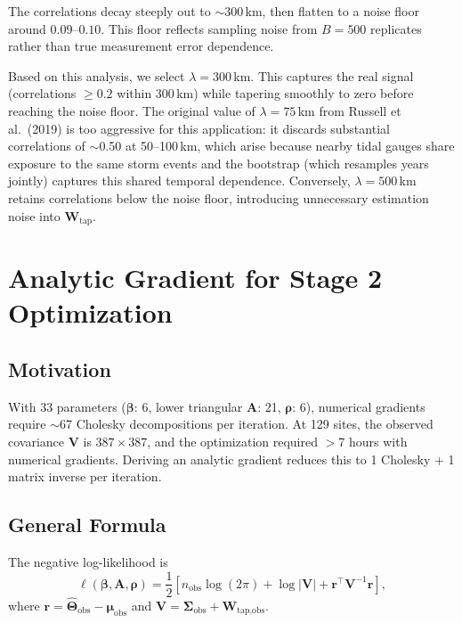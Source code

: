 \documentclass[11pt]{article}
\newcommand{\bbeta}{\bm{\beta}}
\newcommand{\bA}{\mathbf{A}}
\newcommand{\bW}{\mathbf{W}}
\newcommand{\bV}{\mathbf{V}}
\newcommand{\bSigma}{\bm{\Sigma}}
\newcommand{\bTheta}{\bm{\Theta}}
\newcommand{\br}{\mathbf{r}}
\begin{document}
The correlations decay steeply out to $\sim$300\,km, then flatten to a noise floor around $0.09$--$0.10$. This floor reflects sampling noise from $B = 500$ replicates rather than true measurement error dependence.

Based on this analysis, we select $\lambda = 300$\,km. This captures the real signal (correlations $\geq 0.2$ within 300\,km) while tapering smoothly to zero before reaching the noise floor. The original value of $\lambda = 75$\,km from Russell et al.\ (2019) is too aggressive for this application: it discards substantial correlations of $\sim$0.50 at 50--100\,km, which arise because nearby tidal gauges share exposure to the same storm events and the bootstrap (which resamples years jointly) captures this shared temporal dependence. Conversely, $\lambda = 500$\,km retains correlations below the noise floor, introducing unnecessary estimation noise into $\bW_{\text{tap}}$.

\section{Analytic Gradient for Stage 2 Optimization}
\label{sec:gradient}

\subsection{Motivation}

With 33 parameters ($\bbeta$: 6, lower triangular $\bA$: 21, $\bm{\rho}$: 6), numerical gradients require $\sim$67 Cholesky decompositions per iteration. At 129 sites, the observed covariance $\bV$ is $387 \times 387$, and the optimization required $>$7 hours with numerical gradients. Deriving an analytic gradient reduces this to 1 Cholesky + 1 matrix inverse per iteration.

\subsection{General Formula}

The negative log-likelihood is
\begin{equation}\label{eq:nll}
\ell(\bbeta, \bA, \bm{\rho}) = \frac{1}{2}\left[n_{\text{obs}} \log(2\pi) + \log|\bV| + \br^\top \bV^{-1} \br\right],
\end{equation}
where $\br = \hat{\bTheta}_{\text{obs}} - \bm{\mu}_{\text{obs}}$ and $\bV = \bSigma_{\text{obs}} + \bW_{\text{tap,obs}}$.
\end{document}
